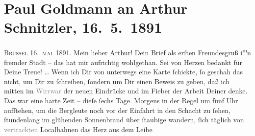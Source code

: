 

         
         \newcommand{\erwaehntePersonen}{Personen: Richard Beer-Hofmann, Hugo von Hofmannsthal, Jaques Joachim, Julius Kulka, Felix Salten, Falk Schupp, Gustav Schwarzkopf, Boris Van-Jung, Leo Van-Jung, Olga Waissnix}
         \newcommand{\erwaehnteInstitutionen}{Institutionen: Houghton Library, Jung Wien}
         \newcommand{\erwaehnteOrte}{Orte: Bad Ischl, Baden bei Wien, Belgien, Brüssel, Halle an der Saale, Joseph G. Wieninger, Weinhandlung, Wien}
         \newcommand{\erwaehnteWerke}{Werke: Das Märchen. Schauspiel in drei Aufzügen, Frankfurter Zeitung, Tagebuch}
               \section[Paul Goldmann an Arthur Schnitzler, 16. 5. 1891]{ Paul Goldmann an Arthur Schnitzler, 16. 5. 1891}\nopagebreak{}\rehead{ }\begin{ledgroupsized}[t]{13cm}\normalsize\beginnumbering \toendnotes[C]{\smallbreak\pagebreak[2]} 
\toendnotes[C]{\smallbreak}\pstart
           \centering{}{\pb}\textsc{Brüssel}{ }16. \textsc{mai} 1891.\pend
           \pstart\center{}Mein lieber Arthur!\pend\pstart
           Dein Brief als erſten Freundesgruß i\substVorne{}\textsuperscript{m}\substDazwischen{}n\substHinten{} fremder Stadt – das
               hat mir aufrichtig wohlgethan. Sei von Herzen bedankt für Deine Treue! {\dots} Wenn ich Dir von unterwegs eine Karte ſchickte, ſo
               geschah das nicht, um Dir zu ſchreiben, ſondern um Dir einen Beweis zu geben, daß ich
               mitten im \textcolor{gray}{Wirrwar} der neuen Eindrücke und im Fieber der Arbeit
               Deiner denke. Das war eine harte Zeit – dieſe ſechs Tage\textcolor{gray}{.} Morgens
               in der Regel um fünf Uhr aufſtehen, um die Bergleute noch vor der Einfahrt in den
               Schacht zu ſehen, ſtundenlang im glühenden Sonnenbrand über ſtaubige \label{K_L02663-5v}\label{K_L02663-5h} wandern,
               ſich täglich von \textcolor{gray}{vertrackten} Localbahnen das Herz aus dem Leibe

\end{ledgroupsized}
